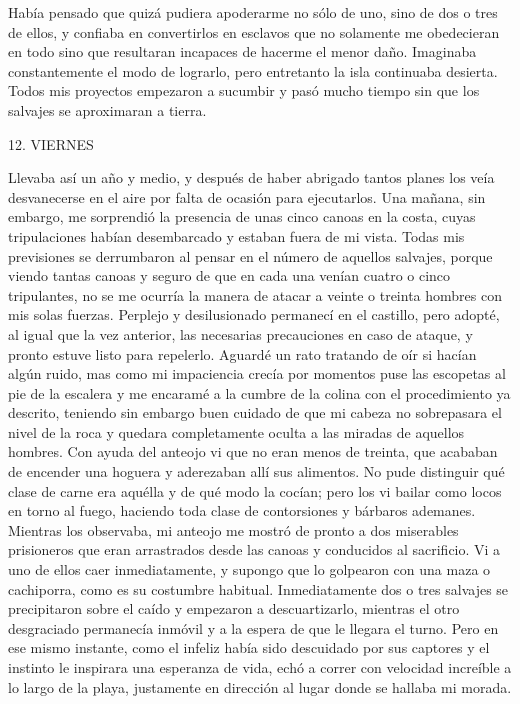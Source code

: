 \documentclass{novela}
\begin{document}
    Había pensado que quizá pudiera apoderarme no sólo de uno, sino de dos o tres de ellos, y confiaba en convertirlos en esclavos que no solamente me obedecieran en todo sino que resultaran incapaces de hacerme el menor daño. Imaginaba constantemente el modo de lograrlo, pero entretanto la isla continuaba desierta. Todos mis proyectos empezaron a sucumbir y pasó mucho tiempo sin que los salvajes se aproximaran a tierra.





    12. VIERNES




    Llevaba así un año y medio, y después de haber abrigado tantos planes los veía desvanecerse en el aire por falta de ocasión para ejecutarlos. Una mañana, sin embargo, me sorprendió la presencia de unas cinco canoas en la costa, cuyas tripulaciones habían desembarcado y estaban fuera de mi vista. Todas mis previsiones se derrumbaron al pensar en el número de aquellos salvajes, porque viendo tantas canoas y seguro de que en cada una venían cuatro o cinco tripulantes, no se me ocurría la manera de atacar a veinte o treinta hombres con mis solas fuerzas. Perplejo y desilusionado permanecí en el castillo, pero adopté, al igual que la vez anterior, las necesarias precauciones en caso de ataque, y pronto estuve listo para repelerlo. Aguardé un rato tratando de oír si hacían algún ruido, mas como mi impaciencia crecía por momentos puse las escopetas al pie de la escalera y me encaramé a la cumbre de la colina con el procedimiento ya descrito, teniendo sin embargo buen cuidado de que mi cabeza no sobrepasara el nivel de la roca y quedara completamente oculta a las miradas de aquellos hombres. Con ayuda del anteojo vi que no eran menos de treinta, que acababan de encender una hoguera y aderezaban allí sus alimentos. No pude distinguir qué clase de carne era aquélla y de qué modo la cocían; pero los vi bailar como locos en torno al fuego, haciendo toda clase de contorsiones y bárbaros ademanes.
    Mientras los observaba, mi anteojo me mostró de pronto a dos miserables prisioneros que eran arrastrados desde las canoas y conducidos al sacrificio. Vi a uno de ellos caer inmediatamente, y supongo que lo golpearon con una maza o cachiporra, como es su costumbre habitual. Inmediatamente dos o tres salvajes se precipitaron sobre el caído y empezaron a descuartizarlo, mientras el otro desgraciado permanecía inmóvil y a la espera de que le llegara el turno. Pero en ese mismo instante, como el infeliz había sido descuidado por sus captores y el instinto le inspirara una esperanza de vida, echó a correr con velocidad increíble a lo largo de la playa, justamente en dirección al lugar donde se hallaba mi morada.
\end{document}
